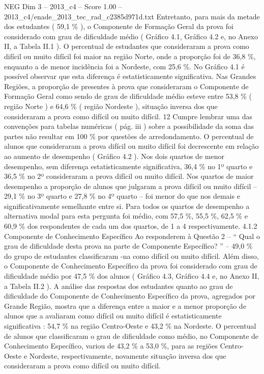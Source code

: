\begin{textsample}{NEG Dim 3 – 2013\_c4 – Score 1.00 – 2013\_c4/enade\_2013\_tec\_rad\_c2385d971d.txt}
Entretanto, para mais da metade dos estudantes ( 59,1 \% ), o Componente de Formação Geral da prova foi considerado com grau de dificuldade médio ( Gráfico 4.1, Gráfico 4.2 e, no Anexo II, a Tabela II.1 ).
O percentual de estudantes que consideraram a prova como difícil ou muito difícil foi maior na região Norte, onde a proporção foi de 36,8 \%, enquanto a de menor incidência foi a Nordeste, com 25,6 \%.
No Gráfico 4.1 é possível observar que esta diferença é estatisticamente significativa.
Nas Grandes Regiões, a proporção de presentes à prova que consideraram o Componente de Formação Geral como sendo de grau de dificuldade médio esteve entre 53,8 \% ( região Norte ) e 64,6 \% ( região Nordeste ), situação inversa dos que consideraram a prova como difícil ou muito difícil. 12 Cumpre lembrar uma das convenções para tabelas numéricas ( pág. iii ) sobre a possibilidade da soma das partes não resultar em 100 \% por questões de arredondamento.
O percentual de alunos que consideraram a prova difícil ou muito difícil foi decrescente em relação ao aumento de desempenho ( Gráfico 4.2 ).
Nos dois quartos de menor desempenho, sem diferença estatisticamente significativa, 36,4 \% no 1º quarto e 36,5 \% no 2º consideraram a prova difícil ou muito difícil.
Nos quartos de maior desempenho a proporção de alunos que julgaram a prova difícil ou muito difícil – 29,1 \% no 3º quarto e 27,8 \% no 4º quarto – foi menor do que nos demais e significativamente semelhante entre si.
Para todos os quartos de desempenho a alternativa modal para esta pergunta foi médio, com 57,5 \%, 55,5 \%, 62,5 \% e 60,9 \% dos respondentes de cada um dos quartos, de 1 a 4 respectivamente. 4.1.2 Componente de Conhecimento Específico Ao responderem à Questão 2 – “ Qual o grau de dificuldade desta prova na parte de Componente Específico? ” – 49,0 \% do grupo de estudantes classificaram -na como difícil ou muito difícil.
Além disso, o Componente de Conhecimento Específico da prova foi considerado com grau de dificuldade médio por 47,5 \% dos alunos ( Gráfico 4.3, Gráfico 4.4 e, no Anexo II, a Tabela II.2 ).
A análise das respostas dos estudantes quanto ao grau de dificuldade do Componente de Conhecimento Específico da prova, agregados por Grande Região, mostra que a diferença entre a maior e a menor proporção de alunos que a avaliaram como difícil ou muito difícil é estatisticamente significativa : 54,7 \% na região Centro-Oeste e 43,2 \% na Nordeste.
O percentual de alunos que classificaram o grau de dificuldade como médio, no Componente de Conhecimento Específico, variou de 43,2 \% a 53,0 \%, para as regiões Centro-Oeste e Nordeste, respectivamente, novamente situação inversa dos que consideraram a prova como difícil ou muito difícil.

\end{textsample}
